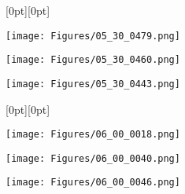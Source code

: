 \begin{figure}
\centering

\makebox[0.01\linewidth]{}

\begin{minipage}[b]{0.01\linewidth}
    \raisebox{2em}[0pt][0pt]{} 
\end{minipage}
\begin{minipage}[b]{0.25\linewidth}
    \centering
    \texttt{[image: Figures/05\_30\_0479.png]}
\end{minipage}
\begin{minipage}[b]{0.25\linewidth}
    \centering
    \texttt{[image: Figures/05\_30\_0460.png]}
\end{minipage}
\begin{minipage}[b]{0.25\linewidth}
    \centering
    \texttt{[image: Figures/05\_30\_0443.png]}
\end{minipage}

\begin{minipage}[b]{0.01\linewidth}
    \raisebox{2em}[0pt][0pt]{} %
\end{minipage}
\begin{minipage}[b]{0.25\linewidth}
    \centering
    \texttt{[image: Figures/06\_00\_0018.png]}
\end{minipage}
\begin{minipage}[b]{0.25\linewidth}
    \centering
    \texttt{[image: Figures/06\_00\_0040.png]}
\end{minipage}
\begin{minipage}[b]{0.25\linewidth}
    \centering
    \texttt{[image: Figures/06\_00\_0046.png]}
\end{minipage}


\end{figure}
